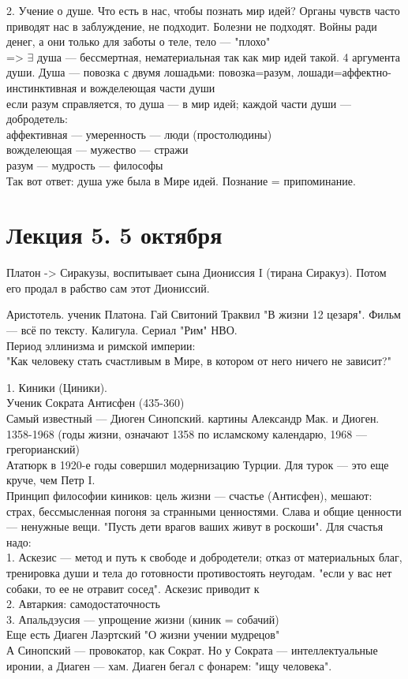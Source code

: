 \documentclass[a4paper,12pt]{article}
\begin{document}
2. Учение о душе. Что есть в нас, чтобы познать мир идей? Органы чувств часто приводят нас в заблуждение, не подходит. Болезни не подходят. Войны ради денег, а они только для заботы о теле, тело --- "плохо"\\
=> $\exists$ душа --- бессмертная, нематериальная так как мир идей такой. 4 аргумента души. Душа --- повозка с двумя лошадьми: повозка=разум, лошади=аффектно-инстинктивная и вожделеющая части души\\
если разум справляется, то душа --- в мир идей; каждой части души --- добродетель:\\
аффективная --- умеренность --- люди (простолюдины)\\
вожделеющая --- мужество --- стражи\\
разум --- мудрость --- философы\\
Так вот ответ: душа уже была в Мире идей. Познание = припоминание.
\section{Лекция 5. 5 октября}
Платон -> Сиракузы, воспитывает сына Диониссия I (тирана Сиракуз). Потом его продал в рабство сам этот Диониссий.

Аристотель. ученик Платона. Гай Свитоний Траквил "В жизни 12 цезаря". Фильм --- всё по тексту. Калигула. Сериал "Рим" НВО. \\
Период эллинизма и римской империи: \\
"Как человеку стать счастливым в Мире, в котором от него ничего не зависит?"

1. Киники (Циники).\\
Ученик Сократа Антисфен (435-360)\\
Самый известный --- Диоген Синопский. картины Александр Мак. и Диоген. \\
1358-1968 (годы жизни, означают 1358 по исламскому календарю, 1968 --- грегорианский)\\
Ататюрк в 1920-е годы совершил модернизацию Турции. Для турок --- это еще круче, чем Петр I.\\
Принцип философии киников: цель жизни --- счастье (Антисфен), мешают: страх, бессмысленная погоня за странными ценностями. Слава и общие ценности --- ненужные вещи. "Пусть дети врагов ваших живут в роскоши". Для счастья надо:\\
1. Аскезис --- метод и путь к свободе и добродетели; отказ от материальных благ, тренировка души и тела до готовности противостоять неугодам. "если у вас нет собаки, то ее не отравит сосед". Аскезис приводит к\\
2. Автаркия: самодостаточность\\
3. Апальдэусия --- упрощение жизни (киник = собачий)\\
Еще есть Диаген Лаэртский "О жизни учении мудрецов"\\
А Синопский --- провокатор, как Сократ. Но у Сократа --- интеллектуальные иронии, а Диаген --- хам. Диаген бегал с фонарем: "ищу человека".
\end{document}
